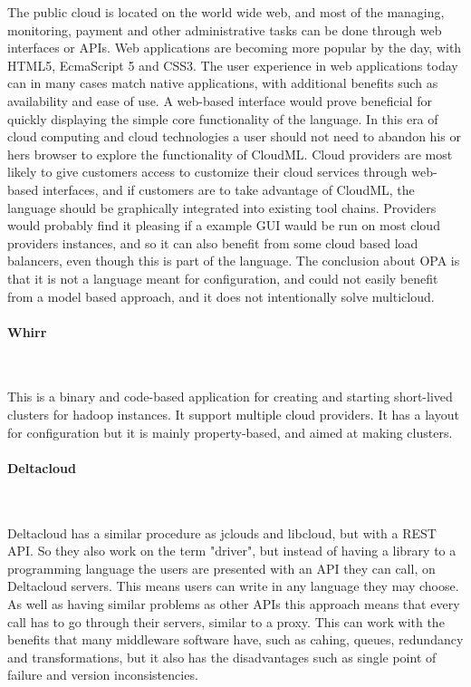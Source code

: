 The public cloud is located on the world wide web, and most of the managing, monitoring, 
payment and other administrative tasks can be done through web interfaces or APIs. 
Web applications are becoming more popular by the day, with HTML5, EcmaScript 5 and CSS3. 
The user experience in web applications today can in many cases match native applications, with additional benefits such as availability and ease of use.
A web-based interface would prove beneficial for quickly displaying the simple core functionality of the language. 
In this era of cloud computing and cloud technologies a user should not need to abandon his or hers browser to explore the functionality of CloudML.
Cloud providers are most likely to give customers access to customize their cloud services through web-based interfaces, 
and if customers are to take advantage of CloudML, the language should be graphically integrated into existing tool chains. 
Providers would probably find it pleasing if a example GUI wauld be run on most cloud providers instances, 
and so it can also benefit from some cloud based load balancers, even though this is part of the language. 
The conclusion about OPA is that it is not a language meant for configuration, and could not easily benefit from a model based approach, 
and it does not intentionally solve multicloud.

\paragraph{Whirr}~\cite{whirr}

This is a binary and code-based application for creating and starting short-lived clusters for hadoop instances.
It support multiple cloud providers. It has a layout for configuration but it is mainly property-based, and aimed at making clusters. 

\paragraph{Deltacloud}~\cite{deltacloud}

Deltacloud has a similar procedure as jclouds and libcloud, but with a REST API. 
So they also work on the term "driver", but instead of having a library to a programming language the users are presented with an API they can call, 
on Deltacloud servers. This means users can write in any language they may choose. 
As well as having similar problems as other APIs this approach means that every call has to go through their servers, 
similar to a proxy. This can work with the benefits that many middleware software have, such as cahing, queues, 
redundancy and transformations, but it also has the disadvantages such as single point of failure and version inconsistencies.

